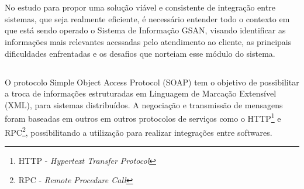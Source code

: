 



\section{\fontsize{12}{1} }

No estudo para propor uma solução viável e consistente de integração entre sistemas, que seja realmente eficiente, é necessário entender todo o contexto em que está sendo operado o Sistema de Informação GSAN, visando identificar as informações mais relevantes acessadas pelo atendimento ao cliente, as principais dificuldades enfrentadas e os desafios que norteiam esse módulo do sistema. 



\subsection{\fontsize{12}{1} }
O protocolo Simple Object Access Protocol (SOAP) tem o objetivo de possibilitar a troca de informações estruturadas em Linguagem de Marcação Extensível (XML), para sistemas distribuídos. A negociação e transmissão de mensagens foram baseadas em outros em outros protocolos de serviços como o HTTP\footnote{HTTP - \textit{Hypertext Transfer Protocol}}  e RPC\footnote{RPC - \textit{Remote Procedure Call}}, possibilitando a utilização para realizar integrações entre softwares.

